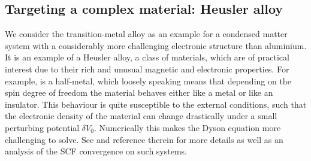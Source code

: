 \documentclass[hidelinks,onefignum,onetabnum]{siamart250211}
\begin{document}
%
%
%
\subsection{Targeting a complex material: Heusler alloy}\label{sec:heusler}
We consider the \linebreak {} transition-metal alloy
as an example for a condensed matter system with a considerably more challenging
electronic structure than aluminium.
It is an example of a Heusler alloy, a class of materials,
which are
of practical interest due to their rich and unusual magnetic and electronic properties.
For example,  is a half-metal, which loosely speaking
means that depending on the spin degree of freedom the material behaves
either like a metal or like an insulator.
%
This behaviour is quite susceptible to the external conditions,
such that the electronic density of the material can change drastically
under a small perturbing potential $\delta V_0$. Numerically this makes
the Dyson equation more challenging to solve. %
See \cite{herbstBlackboxInhomogeneousPreconditioning2020}
and reference therein for more details as well as an analysis of the SCF
convergence on such systems.
\end{document}
